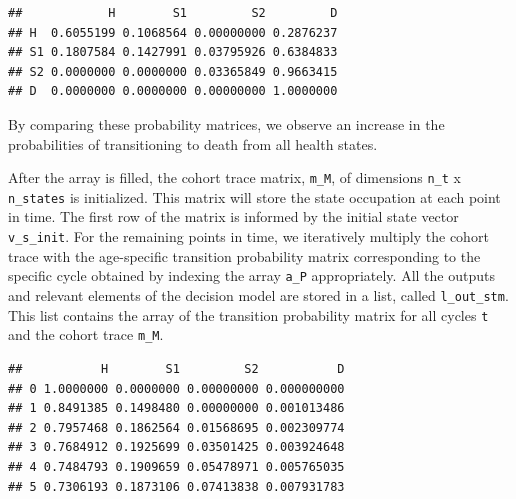 \documentclass[]{book}
\newenvironment{Shaded}{\begin{snugshade}}{\end{snugshade}}
\newcommand{\CommentTok}[1]{\textcolor[rgb]{0.56,0.35,0.01}{\textit{#1}}}
\newcommand{\KeywordTok}[1]{\textcolor[rgb]{0.13,0.29,0.53}{\textbf{#1}}}
\newcommand{\NormalTok}[1]{#1}
\newcommand{\OperatorTok}[1]{\textcolor[rgb]{0.81,0.36,0.00}{\textbf{#1}}}
\begin{document}
\begin{Shaded}
\end{Shaded}

\begin{verbatim}
##            H        S1         S2         D
## H  0.6055199 0.1068564 0.00000000 0.2876237
## S1 0.1807584 0.1427991 0.03795926 0.6384833
## S2 0.0000000 0.0000000 0.03365849 0.9663415
## D  0.0000000 0.0000000 0.00000000 1.0000000
\end{verbatim}

By comparing these probability matrices, we observe an increase in the probabilities of transitioning to death from all health states.

After the array is filled, the cohort trace matrix, \texttt{m\_M}, of dimensions \texttt{n\_t} x \texttt{n\_states} is initialized. This matrix will store the state occupation at each point in time. The first row of the matrix is informed by the initial state vector \texttt{v\_s\_init}. For the remaining points in time, we iteratively multiply the cohort trace with the age-specific transition probability matrix corresponding to the specific cycle obtained by indexing the array \texttt{a\_P} appropriately. All the outputs and relevant elements of the decision model are stored in a list, called \texttt{l\_out\_stm}. This list contains the array of the transition probability matrix for all cycles \texttt{t} and the cohort trace \texttt{m\_M}.

\begin{Shaded}
\end{Shaded}

\begin{verbatim}
##           H        S1         S2           D
## 0 1.0000000 0.0000000 0.00000000 0.000000000
## 1 0.8491385 0.1498480 0.00000000 0.001013486
## 2 0.7957468 0.1862564 0.01568695 0.002309774
## 3 0.7684912 0.1925699 0.03501425 0.003924648
## 4 0.7484793 0.1909659 0.05478971 0.005765035
## 5 0.7306193 0.1873106 0.07413838 0.007931783
\end{verbatim}
\end{document}
